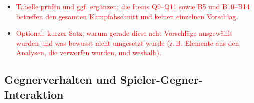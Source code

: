 \documentclass[../Main.tex]{subfiles}
\begin{document}
\begin{itemize}[leftmargin=1.5cm]
    \item \textcolor{red}{Tabelle prüfen und ggf. ergänzen; die Items Q9--Q11 sowie B5 und B10--B14 betreffen den gesamten Kampfabschnitt und keinen einzelnen Vorschlag.}
    \item \textcolor{red}{Optional: kurzer Satz, warum gerade diese acht Vorschläge ausgewählt wurden und was bewusst nicht umgesetzt wurde (z.\,B. Elemente aus den Analysen, die verworfen wurden, und weshalb).}
\end{itemize}

\subsection{Gegnerverhalten und Spieler-Gegner-Interaktion} \label{sec:UmsetzungGegner}
\end{document}
